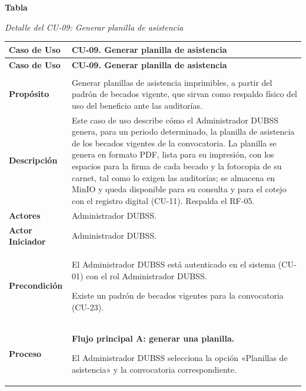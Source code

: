 \label{tab:detalle_cu09}
\noindent\textbf{Tabla~\thetable}\par\nopagebreak
\noindent\textit{Detalle del CU-09: Generar planilla de asistencia}\par\nopagebreak
\begingroup\small\linespread{1}\selectfont
\begin{longtable}{>{\raggedright\arraybackslash}p{2.9cm} >{\raggedright\arraybackslash}p{12.6cm}}
\toprule
\textbf{Caso de Uso} & \textbf{CU-09. Generar planilla de asistencia} \\
\midrule
\endfirsthead
\toprule
\textbf{Caso de Uso} & \textbf{CU-09. Generar planilla de asistencia} \\
\midrule
\endhead
\endfoot
\bottomrule
\multicolumn{2}{l}{\textit{Nota.} Elaboración propia.} \\
\endlastfoot
\textbf{Propósito} & Generar planillas de asistencia imprimibles, a partir del padrón de becados vigente, que sirvan como respaldo físico del uso del beneficio ante las auditorías. \\
\midrule
\textbf{Descripción} & Este caso de uso describe cómo el Administrador DUBSS genera, para un periodo determinado, la planilla de asistencia de los becados vigentes de la convocatoria. La planilla se genera en formato PDF, lista para su impresión, con los espacios para la firma de cada becado y la fotocopia de su carnet, tal como lo exigen las auditorías; se almacena en MinIO y queda disponible para su consulta y para el cotejo con el registro digital (CU-11). Respalda el RF-05. \\
\midrule
\textbf{Actores} & Administrador DUBSS. \\
\midrule
\textbf{Actor Iniciador} & Administrador DUBSS. \\
\midrule
\textbf{Precondición} & \vspace{-\baselineskip}\begin{cuvin}
    \item El Administrador DUBSS está autenticado en el sistema (CU-01) con el rol Administrador DUBSS.
    \item Existe un padrón de becados vigentes para la convocatoria (CU-23).
\end{cuvin} \\
\midrule
\textbf{Proceso} & \textbf{Flujo principal A: generar una planilla.}
\begin{cupasos}
    \item El Administrador DUBSS selecciona la opción «Planillas de asistencia» y la convocatoria correspondiente.

\end{cupasos}
\end{longtable}
